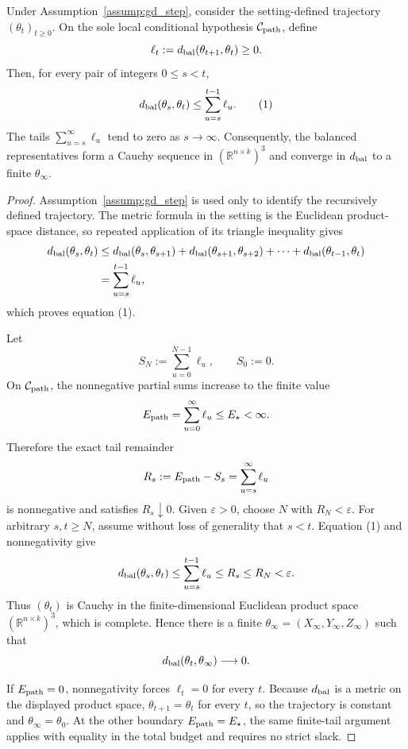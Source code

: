 \begin{lemma}
\label{lem:step-011-finite-path-limit}
Under Assumption~\ref{assump:gd_step}, consider the setting-defined trajectory
\((\theta_t)_{t\ge0}\). On the sole local conditional hypothesis
\(\mathcal C_{\rm path}\), define
\[
  \ell_t:=d_{\rm bal}(\theta_{t+1},\theta_t)\ge0.
\]
Then, for every pair of integers \(0\le s<t\),
\[
  d_{\rm bal}(\theta_s,\theta_t)
  \le \sum_{u=s}^{t-1}\ell_u.                         \tag{1}
\]
The tails \(\sum_{u=s}^{\infty}\ell_u\) tend to zero as
\(s\to\infty\). Consequently, the balanced representatives form a Cauchy
sequence in \((\mathbb R^{n\times k})^3\) and converge in
\(d_{\rm bal}\) to a finite \(\theta_\infty\).

\end{lemma}

\begin{proof}
Assumption~\ref{assump:gd_step} is used only to
identify the recursively defined trajectory. The metric formula in the
setting is the Euclidean product-space distance, so repeated application of
its triangle inequality gives
\[
\begin{aligned}
  d_{\rm bal}(\theta_s,\theta_t)
  &\le d_{\rm bal}(\theta_s,\theta_{s+1})
      +d_{\rm bal}(\theta_{s+1},\theta_{s+2})
      +\cdots+d_{\rm bal}(\theta_{t-1},\theta_t)\\
  &=\sum_{u=s}^{t-1}\ell_u,
\end{aligned}
\]
which proves equation (1).

Let
\[
  S_N:=\sum_{u=0}^{N-1}\ell_u,
  \qquad S_0:=0.
\]
On \(\mathcal C_{\rm path}\), the nonnegative partial sums increase to the
finite value
\[
  E_{\rm path}=\sum_{u=0}^{\infty}\ell_u\le E_\star<\infty.
\]
Therefore the exact tail remainder
\[
  R_s:=E_{\rm path}-S_s=\sum_{u=s}^{\infty}\ell_u
\]
is nonnegative and satisfies \(R_s\downarrow0\). Given
\(\varepsilon>0\), choose \(N\) with \(R_N<\varepsilon\). For arbitrary
\(s,t\ge N\), assume without loss of generality that \(s<t\). Equation (1)
and nonnegativity give
\[
  d_{\rm bal}(\theta_s,\theta_t)
  \le\sum_{u=s}^{t-1}\ell_u
  \le R_s\le R_N<\varepsilon.
\]
Thus \((\theta_t)\) is Cauchy in the finite-dimensional Euclidean product
space
\(
  (\mathbb R^{n\times k})^3
\),
which is complete. Hence there is a finite
\(
  \theta_\infty=(X_\infty,Y_\infty,Z_\infty)
\)
such that
\[
  d_{\rm bal}(\theta_t,\theta_\infty)\longrightarrow0.
\]

If \(E_{\rm path}=0\), nonnegativity forces \(\ell_t=0\) for every \(t\).
Because \(d_{\rm bal}\) is a metric on the displayed product space,
\(\theta_{t+1}=\theta_t\) for every \(t\), so the trajectory is constant and
\(\theta_\infty=\theta_0\). At the other boundary
\(E_{\rm path}=E_\star\), the same finite-tail argument applies with equality
in the total budget and requires no strict slack. 

\end{proof}


